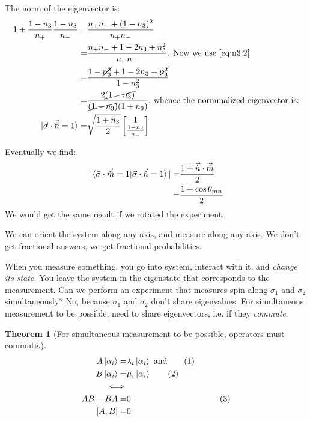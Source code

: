 \documentclass[]{article}
\newcommand\numberthis{\addtocounter{equation}{1}\tag{\theequation}}
\newtheorem{thm}{Theorem}
\begin{document}
The norm of the eigenvector is:
 \begin{align*}
 	1+\frac{1-n_3}{n_+}\frac{1-n_3}{n_-}=& \frac{n_+n_- + (1-n_3)^2 }{n_+n_-}\\ 
 	=&\frac{n_+n_- + 1 -2 n_3 + n_3^2}{n_+n_-} \text{. Now we use \eqref{eq:n3:2}}\\
 	=& \frac{1-\cancel{n_3^2}+1 - 2n_3 +\cancel{n_3^2}}{1-n_3^2}\\
 	=& \frac{2\cancel{(1-n_3)}}{\cancel{(1-n_3)}(1+n_3)} \text{, whence the normmalized eigenvector is:}\\
 	\ket{\vec{\sigma} \cdot \vec{\hat{n}}=1} =& \sqrt{\frac{1+n_3}{2}} \begin{bmatrix}
 		1\\\frac{1-n_3}{n_-}
 	\end{bmatrix}
 \end{align*}

Eventually we find:
\begin{align*}
	\vert \braket{\vec{\sigma} \cdot \vec{\hat{m}}=1\vert\vec{\sigma} \cdot \vec{\hat{n}}=1}\vert =& \frac{1 + \vec{\hat{n}} \cdot \vec{\hat{m}}}{2}\\
	=& \frac{1 + \cos{\theta_{mn}}}{2}
\end{align*}
We would get the same result if we rotated the experiment.

We can orient the system along any axis, and measure along any axis. We don't get fractional answers, we get fractional probabilities.

When you measure something, you go into system, interact with it, and \emph{change its state.} You leave the system in the eigenstate that corresponds to the measurement. Can we perform an experiment that measures spin along $\sigma_1$ and $\sigma_2$ simultaneously? No, because $\sigma_1$ and $\sigma_2$ don't share eigenvalues. For simultaneous measurement to be possible, need to share eigenvectors, i.e. if they \emph{commute}.

\begin{thm}[For simultaneous measurement to be possible, operators must commute.]
	\begin{align*}
			A\ket{\alpha_i} =& \lambda_i \ket{\alpha_i} \text{ and} \numberthis \label{eq:simultaneous1}\\
			B\ket{\alpha_i} =& \mu_i \ket{\alpha_i} \numberthis\label{eq:simultaneous2}\\
			\iff &\\
			AB - BA =& 0& \numberthis \label{eq:simultaneous3}\\
			[A,B] =& 0
	\end{align*}
\end{thm}
\end{document}
